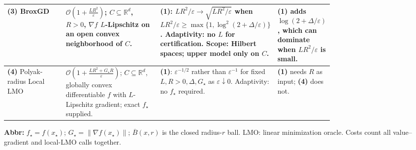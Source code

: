 \begin{table}[tp]
\begin{threeparttable}
\begin{tabularx}{\linewidth}{@{}>{\raggedright\arraybackslash}p{0.20\linewidth}>{\raggedright\arraybackslash}p{0.32\linewidth}>{\raggedright\arraybackslash}p{0.25\linewidth}>{\raggedright\arraybackslash}X@{}}
\midrule
\textbf{(3)} BroxGD \citep[Thm.~3.2(ii)]{kvBrox2026v2} & $\mathcal{O}\!\left(1+\frac{LR^2}{\varepsilon}\right)$; $C\subseteq\mathbb R^d$, $R>0$, $\nabla f$ $L$-Lipschitz on an open convex neighborhood of $C$. & \textbf{(1)}: $LR^2/\varepsilon\to\sqrt{LR^2/\varepsilon}$ when $LR^2/\varepsilon\ge\max\{1,\log^2(2+\Delta/\varepsilon)\}$. Adaptivity: no $L$ for certification. Scope: Hilbert spaces; upper model only on $C$. & \textbf{(1)} adds $\log(2+\Delta/\varepsilon)$, which can dominate when $LR^2/\varepsilon$ is small. \\
\midrule
\textbf{(4)} Polyak-radius Local LMO \citep[Thm.~4, $\vartheta=1$]{uvRichtarikMahran2026v1} & $\mathcal{O}\!\left(1+\frac{LR^2+G_\star R}{\varepsilon}\right)$; $C\subseteq\mathbb R^d$, globally convex differentiable $f$ with $L$-Lipschitz gradient; exact $f_\star$ supplied. & \textbf{(1)}: $\varepsilon^{-1/2}$ rather than $\varepsilon^{-1}$ for fixed $L,R>0,\Delta,G_\star$ as $\varepsilon\downarrow0$. Adaptivity: no $f_\star$ required. & \textbf{(1)} needs $R$ as input; \textbf{(4)} does not. \\
\bottomrule
\end{tabularx}
\begin{tablenotes}[flushleft]\footnotesize
\item[] \textbf{Abbr:} $f_\star=f(x_\star)$; $G_\star=\|\nabla f(x_\star)\|$; $\overline B(x,r)$ is the closed radius-$r$ ball. LMO: linear minimization oracle. Costs count all value--gradient and local-LMO calls together.
\end{tablenotes}
\end{threeparttable}
\end{table}
\clearpage

